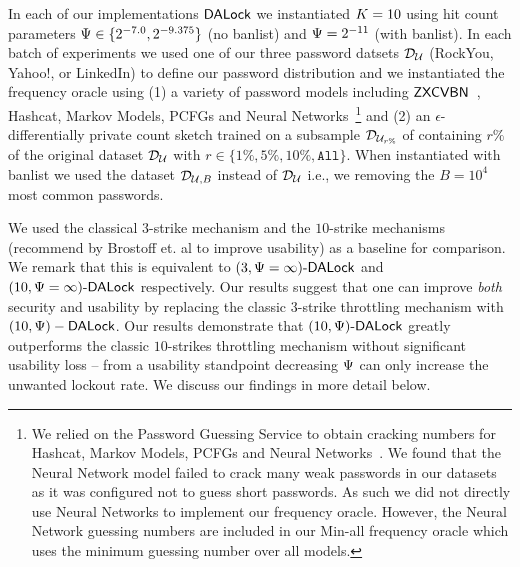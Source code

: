   In each of our implementations $\mathsf{DALock}$ we instantiated $K=10$ using hit count parameters $\Psi \in \{ 2^{-7.0}, 2^{-9.375}\}$ (no banlist) and $\Psi=2^{-11}$ (with banlist). In each batch of experiments we used one of our three password datsets $\mathcal{D}_{{\mathcal{U}}}$ (RockYou, Yahoo!, or LinkedIn) to define our password distribution and we instantiated the frequency oracle using (1) a variety of password models including $\mathsf{ZXCVBN}$~\cite{USENIX:Wheeler16}, Hashcat, Markov Models, PCFGs and Neural Networks~\cite{USENIX:USBCCKKMMS15}\footnote{We relied on the Password Guessing Service to obtain cracking numbers for Hashcat, Markov Models, PCFGs and Neural Networks~\cite{USENIX:USBCCKKMMS15}. We found that the Neural Network model failed to crack many weak passwords in our datasets as it was configured not to guess short passwords. As such we did not directly use Neural Networks to implement our frequency oracle. However, the Neural Network guessing numbers are included in our Min-all frequency oracle which uses the minimum guessing number over all models.} and (2) an $\epsilon$-differentially private count sketch trained on a subsample $\mathcal{D}_{{\mathcal{U}_{r\%}}}$ of containing $r\%$ of the original dataset $\mathcal{D}_{{\mathcal{U}}}$ with $r \in \{1\%, 5\%, 10\%, \mathtt{All}\}$. When instantiated with banlist we used the dataset $\mathcal{D}_{{\mathcal{U}, B}}$ instead of $\mathcal{D}_{{\mathcal{U}}}$ i.e., we  removing the $B=10^4$ most common passwords.







 We used the classical $3$-strike mechanism  and the $10$-strike mechanisms (recommend by Brostoff et. al \cite{brostoff2003ten} to improve usability) as a baseline for comparison. We remark that this is equivalent to $(3, \Psi=\infty)\text{-}\mathsf{DALock}$ and $(10, \Psi=\infty)\text{-}\mathsf{DALock}$ respectively. Our results suggest that one can improve {\em both} security and usability by replacing the classic 3-strike throttling mechanism with $(10,\Psi)-\mathsf{DALock}$. Our results demonstrate that $(10, \Psi)\text{-}\mathsf{DALock}$ greatly outperforms the classic $10$-strikes throttling mechanism without significant usability loss -- from a usability standpoint decreasing $\Psi$ can only increase the unwanted lockout rate. We discuss our findings in more detail below.






